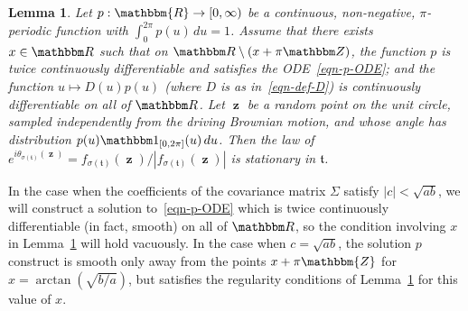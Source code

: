 \documentclass[11pt]{article}
\theoremstyle{plain}
\newtheorem{lem}[thm]{Lemma}
\theoremstyle{definition}
\numberwithin{equation}{section}
\newcommand{\BB}{\mathbbm}
\newcommand{\op}{\operatorname}
\newcommand{\rta}{\rightarrow}
\newcommand{\zz}{{\op{\mathbf{z}}}}
\newcommand{\tz}{{\mathfrak t}}
\begin{document}
\begin{lem} \label{lem-stationary}
Let $p:\BB{R} \rta [0,\infty)$ be a continuous, non-negative, $ \pi$-periodic function with $\int_0^{2\pi} p(u) \, du = 1$. 
Assume that there exists $x\in\BB R$ such that on $\BB R\setminus (x+\pi\BB Z)$, the function $p$ is twice continuously differentiable and satisfies the ODE~\eqref{eqn-p-ODE}; and the function $u \mapsto D(u) p(u)$ (where $D$ is as in~\eqref{eqn-def-D}) is continuously differentiable on all of $\BB R$. 
Let $\zz$ be a random point on the unit circle, sampled independently from the driving Brownian motion, and whose angle has distribution $p(u) \BB 1_{[0,2\pi]}(u) \,du$.  Then the law of $e^{i \theta_{\sigma(\tz)}(\zz)} = f_{\sigma(\tz)}(\zz) / |f_{\sigma(\tz)}(\zz)|$  is stationary in $\tz$.
\end{lem}

In the case when the coefficients of the covariance matrix $\Sigma$ satisfy $|c| < \sqrt{ab}$, we will construct a solution to~\eqref{eqn-p-ODE} which is twice continuously differentiable (in fact, smooth) on all of $\BB R$, so the condition involving $x$ in Lemma~\ref{lem-stationary} will hold vacuously. 
In the case when $c =\sqrt{ab}$, the solution $p$ construct is smooth only away from the points $x + \pi \BB{Z}$ for $x = \arctan(\sqrt{b/a})$, but satisfies the regularity conditions  of Lemma~\ref{lem-stationary} for this value of $x$. 
\end{document}
